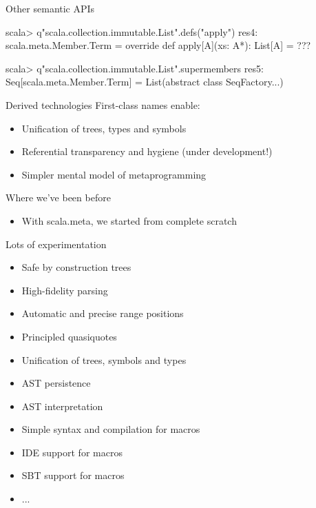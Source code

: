\documentclass[svgnames,dvipsnames,hyperref={bookmarks=false},usepdftitle=false]{beamer}
\begin{document}
\begin{frame}[fragile]{Other semantic APIs}
\begin{semiverbatim}
scala> q"scala.collection.immutable.List".defs("apply")
res4: scala.meta.Member.Term =
override def apply[A](xs: A*): List[A] = ???

scala> q"scala.collection.immutable.List".supermembers
res5: Seq[scala.meta.Member.Term] =
List(abstract class SeqFactory...)
\end{semiverbatim}
\end{frame}

\begin{frame}{Derived technologies}
First-class names enable:
\begin{itemize}
\item Unification of trees, types and symbols
\item Referential transparency and hygiene (under development!)
\item Simpler mental model of metaprogramming
\end{itemize}
\end{frame}



\begin{frame}{Where we've been before}
\begin{itemize}
\item With scala.meta, we started from complete scratch
\end{itemize}
\end{frame}

\begin{frame}{Lots of experimentation}
\begin{itemize}
\item Safe by construction trees
\item High-fidelity parsing
\item Automatic and precise range positions
\item Principled quasiquotes
\item Unification of trees, symbols and types
\item AST persistence
\item AST interpretation
\item Simple syntax and compilation for macros
\item IDE support for macros
\item SBT support for macros
\item ...
\end{itemize}
\end{frame}
\end{document}
